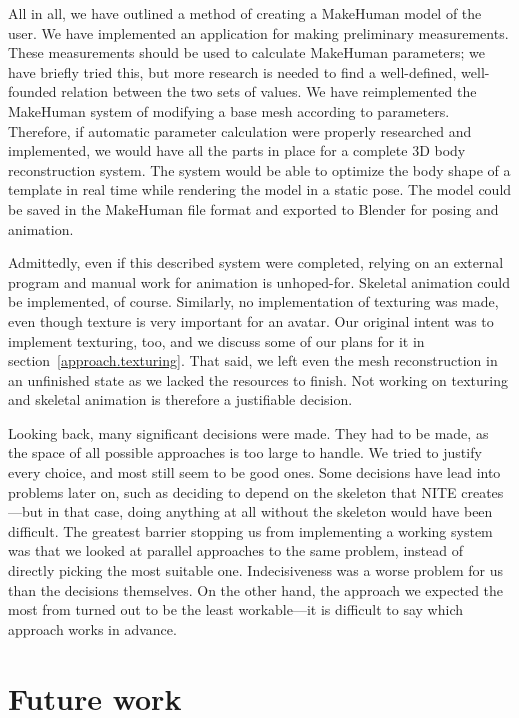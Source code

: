 All in all, we have outlined a method of creating a MakeHuman model of the user. We have implemented an application for making preliminary measurements. These measurements should be used to calculate MakeHuman parameters; we have briefly tried this, but more research is needed to find a well-defined, well-founded relation between the two sets of values. We have reimplemented the MakeHuman system of modifying a base mesh according to parameters. Therefore, if automatic parameter calculation were properly researched and implemented, we would have all the parts in place for a complete 3D body reconstruction system. The system would be able to optimize the body shape of a template in real time while rendering the model in a static pose. The model could be saved in the MakeHuman file format and exported to Blender for posing and animation.

Admittedly, even if this described system were completed, relying on an external program and manual work for animation is unhoped-for. Skeletal animation could be implemented, of course. Similarly, no implementation of texturing was made, even though texture is very important for an avatar. Our original intent was to implement texturing, too, and we discuss some of our plans for it in section~\ref{approach.texturing}. That said, we left even the mesh reconstruction in an unfinished state as we lacked the resources to finish. Not working on texturing and skeletal animation is therefore a justifiable decision.

Looking back, many significant decisions were made. They had to be made, as the space of all possible approaches is too large to handle. We tried to justify every choice, and most still seem to be good ones. Some decisions have lead into problems later on, such as deciding to depend on the skeleton that NITE creates---but in that case, doing anything at all without the skeleton would have been difficult. The greatest barrier stopping us from implementing a working system was that we looked at parallel approaches to the same problem, instead of directly picking the most suitable one. Indecisiveness was a worse problem for us than the decisions themselves. On the other hand, the approach we expected the most from turned out to be the least workable---it is difficult to say which approach works in advance.

\section{Future work}


